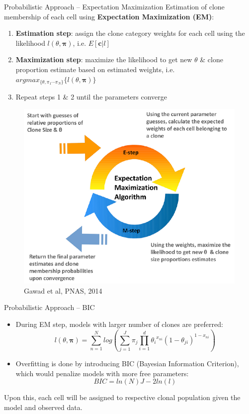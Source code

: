 \documentclass[pdf, aspectratio=169]{beamer}
\begin{document}
\begin{frame}{Probabilistic Approach -- Expectation Maximization}
	Estimation of clone membership of each cell using \textbf{Expectation Maximization (EM)}:
	
	\begin{enumerate}
		\item \textbf{Estimation step}: assign the clone category weights for each cell using the likelihood $l(\theta, \mathbf{\pi})$, i.e. $E[\mathbf{c}|l]$
		\item \textbf{Maximization step}: maximize the likelihood to get new $\theta$ \& clone proportion estimate based on estimated weights, i.e. $argmax_{\{\theta, \pi_1 \cdots \pi_N\}}\{l(\theta, \mathbf{\pi})\}$
		\item Repeat steps 1 \& 2 until the parameters converge
	\end{enumerate}	 
	
	\begin{figure}
		\center
		\includegraphics[scale=.3]{05.png}
		{\tiny Gawad et al, PNAS, 2014}
	\end{figure}
\end{frame}

\begin{frame}{Probabilistic Approach -- BIC}
	\begin{itemize}
		\item During EM step, models with larger number of clones are preferred:
			$$l(\theta, \mathbf{\pi}) = \sum_{n=1}^{N} log( \sum_{j=1}^{J} \pi_j \prod_{i=1}^{d} {\theta_i}^{x_{ni}}(1 - \theta_{ji})^{1 - x_{ni}})$$
		\item Overfitting is done by introducing BIC (Bayesian Information Criterion), which would penalize models with more free parameters:
			$$BIC = ln(N)J - 2 ln(l)$$
	\end{itemize}
	Upon this, each cell will be assigned to respective clonal population given the model and observed data.
\end{frame}
\end{document}

